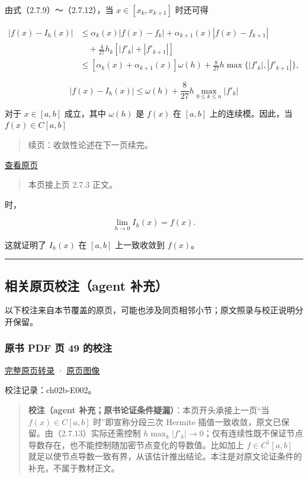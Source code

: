 \documentclass[
  10pt,
  fontset=fandol]{ctexart}
\begin{document}
由式（2.7.9）～（2.7.12），当 \(x\in[x_k,x_{k+1}]\) 时还可得

\[\begin{aligned}
|f(x)-I_h(x)|&\leqslant\alpha_k(x)|f(x)-f_k|+\alpha_{k+1}(x)|f(x)-f_{k+1}|\\
&\quad+\frac{4}{27}h_k[|f'_k|+|f'_{k+1}|]\\
&\leqslant[\alpha_k(x)+\alpha_{k+1}(x)]\omega(h)+\frac{8}{27}h\max\{|f'_k|,|f'_{k+1}|\},
\end{aligned}\]

\[|f(x)-I_h(x)|\leqslant\omega(h)+\frac{8}{27}h\max_{0\leqslant k\leqslant n}|f'_k|\tag{2.7.13}\]

对于 \(x\in[a,b]\) 成立，其中 \(\omega(h)\) 是 \(f(x)\) 在 \([a,b]\) 上的连续模。因此，当 \(f(x)\in C[a,b]\)

\begin{quote}
续页：收敛性论述在下一页续完。
\end{quote}

\href{../../source-images/pdf-049.jpeg}{查看原页}

\begin{quote}
本页接上页 2.7.3 正文。
\end{quote}

时，

\[\lim_{h\to0}I_h(x)=f(x).\]

这就证明了 \(I_h(x)\) 在 \([a,b]\) 上一致收敛到 \(f(x)\)。

\begin{center}\rule{0.5\linewidth}{0.5pt}\end{center}

\subsection{相关原页校注（agent 补充）}\label{ux76f8ux5173ux539fux9875ux6821ux6ce8agent-ux8865ux5145}

以下校注来自本节覆盖的原页，可能也涉及同页相邻小节；原文照录与校正说明分开保留。

\subsubsection{原书 PDF 页 49 的校注}\label{ux539fux4e66-pdf-ux9875-49-ux7684ux6821ux6ce8}

\href{../pages/pdf-049.md}{完整原页转录} · \href{../../source-images/pdf-049.jpeg}{原页图像}

校注记录：ch02b-E002。

\begin{quote}
\textbf{校注（agent 补充；原书论证条件疑漏）}：本页开头承接上一页``当 \(f(x)\in C[a,b]\) 时''即宣称分段三次 Hermite 插值一致收敛，原文已保留。由（2.7.13）实际还需控制 \(h\max_k|f'_k|\to0\)；仅有连续性既不保证节点导数存在，也不能控制随加密节点变化的导数值。比如加上 \(f\in C^1[a,b]\) 就足以使节点导数一致有界，从该估计推出结论。本注是对原文论证条件的补充，不属于教材正文。
\end{quote}
\end{document}
